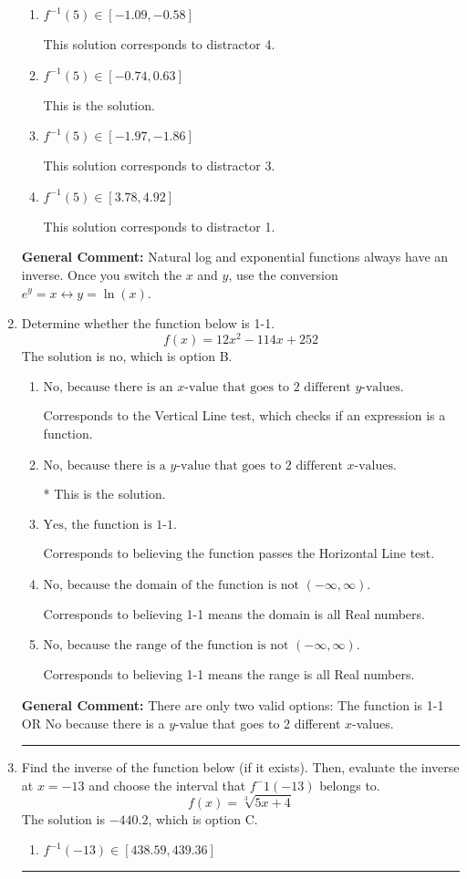\documentclass{extbook}[14pt]
\newcommand{\litem}[1]{\item #1

\rule{\textwidth}{0.4pt}}
\begin{document}
\begin{enumerate}
{\begin{enumerate}[label=\Alph*.]
 This solution corresponds to distractor 2.
\item \( f^{-1}(5) \in [-1.09, -0.58] \)

 This solution corresponds to distractor 4.
\item \( f^{-1}(5) \in [-0.74, 0.63] \)

 This is the solution.
\item \( f^{-1}(5) \in [-1.97, -1.86] \)

 This solution corresponds to distractor 3.
\item \( f^{-1}(5) \in [3.78, 4.92] \)

 This solution corresponds to distractor 1.
\end{enumerate}

\textbf{General Comment:} Natural log and exponential functions always have an inverse. Once you switch the $x$ and $y$, use the conversion $ e^y = x \leftrightarrow y=\ln(x)$.
}
\litem{
Determine whether the function below is 1-1.
\[ f(x) = 12 x^2 - 114 x + 252 \]The solution is \( \text{no} \), which is option B.\begin{enumerate}[label=\Alph*.]
\item \( \text{No, because there is an $x$-value that goes to 2 different $y$-values.} \)

Corresponds to the Vertical Line test, which checks if an expression is a function.
\item \( \text{No, because there is a $y$-value that goes to 2 different $x$-values.} \)

* This is the solution.
\item \( \text{Yes, the function is 1-1.} \)

Corresponds to believing the function passes the Horizontal Line test.
\item \( \text{No, because the domain of the function is not $(-\infty, \infty)$.} \)

Corresponds to believing 1-1 means the domain is all Real numbers.
\item \( \text{No, because the range of the function is not $(-\infty, \infty)$.} \)

Corresponds to believing 1-1 means the range is all Real numbers.
\end{enumerate}

\textbf{General Comment:} There are only two valid options: The function is 1-1 OR No because there is a $y$-value that goes to 2 different $x$-values.
}
\litem{
Find the inverse of the function below (if it exists). Then, evaluate the inverse at $x = -13$ and choose the interval that $f^-1(-13)$ belongs to.
\[ f(x) = \sqrt[3]{5 x + 4} \]The solution is \( -440.2 \), which is option C.\begin{enumerate}[label=\Alph*.]
\item \( f^{-1}(-13) \in [438.59, 439.36] \)


\end{enumerate}}
\end{enumerate}
\end{document}
